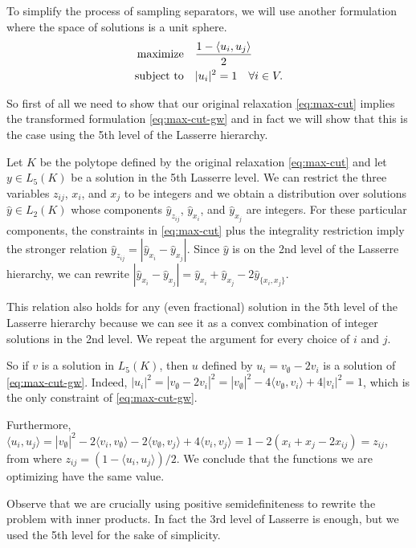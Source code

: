 \documentclass[a4paper,twoside,justified]{tufte-handout}
\begin{document}
To simplify the process of sampling separators, we will use another formulation where the space of solutions is a unit sphere.
\begin{alignat}{2}
\label{eq:max-cut-gw}
  \text{maximize}\hspace{1em}& \frac{1- \langle u_i,u_j \rangle}{2}\notag \\
  \text{subject to}\hspace{1em}& |u_i|^2 = 1 \quad \forall i\in V.
\end{alignat}

So first of all we need to show that our original relaxation \eqref{eq:max-cut} implies the transformed formulation \eqref{eq:max-cut-gw} and in fact we will show that this is the case using the 5th level of the Lasserre hierarchy.

Let $K$ be the polytope defined by the original relaxation \eqref{eq:max-cut} and let $y \in L_5(K)$ be a solution in the 5th Lasserre level. We can restrict the three variables $z_{ij}$, $x_i$, and $x_j$ to be integers and we obtain a distribution over solutions $\hat y \in L_2(K)$ whose components $\hat y_{z_{ij}}$, $\hat y_{x_i}$, and $\hat y_{x_j}$ are integers. For these particular components, the constraints in \eqref{eq:max-cut} plus the integrality restriction imply the stronger relation $\hat y_{z_{ij}}=|\hat y_{x_i}-\hat y_{x_j}|$. Since $\hat y$ is on the 2nd level of the Lasserre hierarchy, we can rewrite $|\hat y_{x_i}-\hat y_{x_j}|=\hat y_{x_i} + \hat y_{x_j} - 2\hat y_{\{x_i,x_j\}}$.

This relation also holds for any (even fractional) solution in the 5th level of the Lasserre hierarchy because we can see it as a convex combination of integer solutions in the 2nd level. We repeat the argument for every choice of $i$ and $j$.

So if $v$ is a solution in $L_5(K)$, then $u$ defined by $u_i = v_\emptyset - 2v_i$ is a solution of  \eqref{eq:max-cut-gw}. Indeed, $|u_i|^2 = |v_\emptyset - 2v_i|^2 = |v_\emptyset|^2 -4\langle v_\emptyset,v_i\rangle + 4|v_i|^2 =1$, which is the only constraint of \eqref{eq:max-cut-gw}.

Furthermore, $\langle u_i,u_j\rangle = |v_\emptyset|^2 -2 \langle v_i,v_\emptyset\rangle -2\langle v_\emptyset,v_j\rangle +4\langle v_i,v_j\rangle = 1 - 2(x_i+x_j-2x_{ij}) = z_{ij}$, from where $z_{ij} = (1-\langle u_i,u_j \rangle)/2$. We conclude that the functions we are optimizing have the same value.

Observe that we are crucially using positive semidefiniteness to rewrite the problem with inner products. In fact the 3rd level of Lasserre is enough\cite{rothvoss2013lasserre}, but we used the 5th level for the sake of simplicity.
\end{document}
